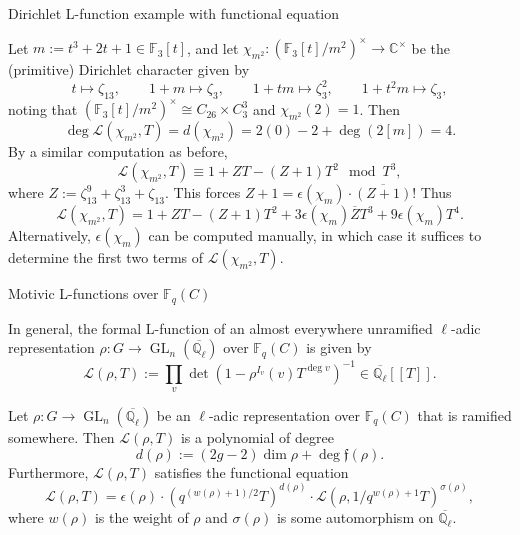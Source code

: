 \documentclass[10pt]{beamer}
\begin{document}
\begin{frame}[t]{Dirichlet L-function example with functional equation}

Let $ m := t^3 + 2t + 1 \in \mathbb{F}_3[t] $, and let $ \chi_{m^2} : (\mathbb{F}_3[t] / m^2)^\times \to \mathbb{C}^\times $ be the (primitive) Dirichlet character given by
$$ t \mapsto \zeta_{13}, \qquad 1 + m \mapsto \zeta_3, \qquad 1 + tm \mapsto \zeta_3^2, \qquad 1 + t^2m \mapsto \zeta_3, $$
noting that $ (\mathbb{F}_3[t] / m^2)^\times \cong C_{26} \times C_3^3 $ and $ \chi_{m^2}(2) = 1 $. Then
$$ \deg\mathcal{L}(\chi_{m^2}, T) = d(\chi_{m^2}) = 2(0) - 2 + \deg(2[m]) = 4. $$
By a similar computation as before,
$$ \mathcal{L}(\chi_{m^2}, T) \equiv 1 + ZT - (Z + 1)T^2 \mod T^3, $$
where $ Z := \zeta_{13}^9 + \zeta_{13}^3 + \zeta_{13} $. This forces $ Z + 1 = \epsilon(\chi_m) \cdot \overline{(Z + 1)} $! Thus
$$ \mathcal{L}(\chi_{m^2}, T) = 1 + ZT - (Z + 1)T^2 + 3\epsilon(\chi_m)\overline{Z}T^3 + 9\epsilon(\chi_m)T^4. $$
Alternatively, $ \epsilon(\chi_m) $ can be computed manually, in which case it suffices to determine the first two terms of $ \mathcal{L}(\chi_{m^2}, T) $.

\end{frame}

\begin{frame}[t]{Motivic L-functions over $ \mathbb{F}_q(C) $}

In general, the formal L-function of an almost everywhere unramified $ \ell $-adic representation $ \rho : G \to \operatorname{GL}_n(\overline{\mathbb{Q}_\ell}) $ over $ \mathbb{F}_q(C) $ is given by
$$ \mathcal{L}(\rho, T) := \prod_v \det(1 - \rho^{I_v}(v)T^{\deg v})^{-1} \in \overline{\mathbb{Q}_\ell}[[T]]. $$

\begin{corollary}
Let $ \rho : G \to \operatorname{GL}_n(\overline{\mathbb{Q}_\ell}) $ be an $ \ell $-adic representation over $ \mathbb{F}_q(C) $ that is ramified somewhere. Then $ \mathcal{L}(\rho, T) $ is a polynomial of degree
$$ d(\rho) := (2g - 2)\dim\rho + \deg\mathfrak{f}(\rho). $$
Furthermore, $ \mathcal{L}(\rho, T) $ satisfies the functional equation
$$ \mathcal{L}(\rho, T) = \epsilon(\rho) \cdot (q^{(w(\rho) + 1) / 2}T)^{d(\rho)} \cdot \mathcal{L}(\rho, 1 / q^{w(\rho) + 1}T)^{\sigma(\rho)}, $$
where $ w(\rho) $ is the weight of $ \rho $ and $ \sigma(\rho) $ is some automorphism on $ \overline{\mathbb{Q}_\ell} $.
\end{corollary}

\end{frame}
\end{document}
